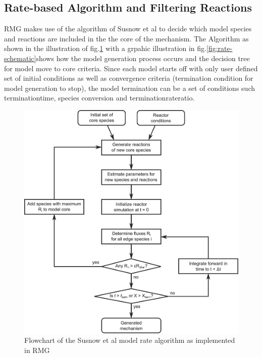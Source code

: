 \subsection{Rate-based Algorithm and Filtering Reactions}
RMG makes use of the algorithm of Susnow et al \cite{Susnow1997Rate-BasedSystems} to decide which model species and reactions are included in the the core of the mechanism. The Algorithm as shown in the illustration of fig.\ref{fig:rmg_modelflux} with a grpahic illustration in fig.\ref{fig:rate-schematic}shows how the model generation process occurs and the decision tree for model move to core criteria. Since each model starts off with only user defined set of initial conditions as well as convergence criteria (termination condition for model generation to stop), the model termination can be a set of conditions such terminationtime, species conversion and terminationrateratio.
\begin{figure}[ht]
    \centering
    \includegraphics{images/rmg_model_flux.jpg}
    \caption{Flowchart of the Susnow et al\cite{Susnow1997Rate-BasedSystems} model rate algorithm as implemented in RMG}
    \label{fig:rmg_modelflux}
\end{figure}

